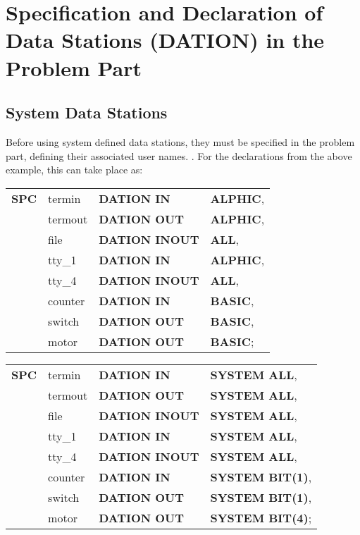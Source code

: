 \section{Specification and Declaration of Data Stations (DATION) in 
the Problem Part}   %
\label{sec_dation_problem_part}

\subsection{System Data Stations}   %

Before using system defined data stations, they must be specified in the
problem part, defining their associated user names. 
.
For the declarations from the above example, this can take place as:

\begin{removed}
\begin{tabular}{llll}
{\bf SPC} & termin  & {\bf DATION IN}    & {\bf ALPHIC},\\
   & termout & {\bf DATION OUT}   & {\bf ALPHIC},\\
   & file    & {\bf DATION INOUT} & {\bf ALL},   \\
   & tty\_1  & {\bf DATION IN}    & {\bf ALPHIC},\\
   & tty\_4  & {\bf DATION INOUT} & {\bf ALL},   \\
   & counter & {\bf DATION IN}    & {\bf BASIC}, \\
   & switch  & {\bf DATION OUT}   & {\bf BASIC}, \\
   & motor   & {\bf DATION OUT}   & {\bf BASIC}; \\
\end{tabular}
\end{removed}
\begin{accepted}
\begin{tabular}{llll}
{\bf SPC} & termin  & {\bf DATION IN}    & {\bf SYSTEM ALL},\\
   & termout & {\bf DATION OUT}   & {\bf SYSTEM ALL},\\
   & file    & {\bf DATION INOUT} & {\bf SYSTEM ALL},   \\
   & tty\_1  & {\bf DATION IN}    & {\bf SYSTEM ALL},\\
   & tty\_4  & {\bf DATION INOUT} & {\bf SYSTEM ALL},   \\
   & counter & {\bf DATION IN}    & {\bf SYSTEM BIT(1)}, \\
   & switch  & {\bf DATION OUT}   & {\bf SYSTEM BIT(1)}, \\
   & motor   & {\bf DATION OUT}   & {\bf SYSTEM BIT(4)}; \\
\end{tabular}
\end{accepted}

